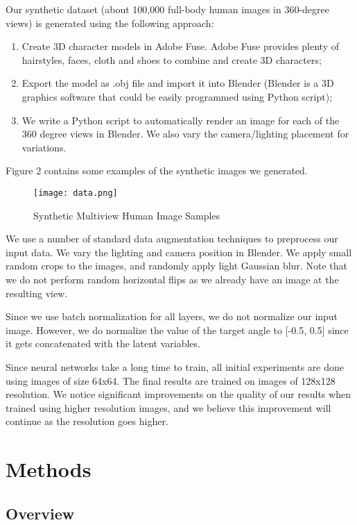 \documentclass[10pt,conference]{IEEEtran}
\begin{document}
Our synthetic dataset (about 100,000 full-body human images in 360-degree views) is generated using the following approach:
\renewcommand{\labelenumi}{\roman{enumi}}
 \begin{enumerate}
   \item Create 3D character models in Adobe Fuse. Adobe Fuse provides plenty of hairstyles, faces, cloth and shoes to combine and create 3D characters;
   \item Export the model as .obj file and import it into Blender (Blender is a 3D graphics software that could be easily programmed using Python script);
   \item We write a Python script to automatically render an image for each of the 360 degree views in Blender. We also vary the camera/lighting placement for variations. 
 \end{enumerate}

Figure 2 contains some examples of the synthetic images we generated.

\begin{figure}[htbp]
\centering
\texttt{[image: data.png]}
\caption{Synthetic Multiview Human Image Samples}
\end{figure}

We use a number of standard data augmentation techniques to preprocess our input data. We vary the lighting and camera position in Blender. We apply small random crops to the images, and randomly apply light Gaussian blur. Note that we do not perform random horizontal flips as we already have an image at the resulting view.

Since we use batch normalization \autocite{ioffe2015batch} for all layers, we do not normalize our input image. However, we do normalize the value of the target angle to [-0.5, 0.5] since it gets concatenated with the latent variables.

Since neural networks take a long time to train, all initial experiments are done using images of size 64x64. The final results are trained on images of 128x128 resolution. We notice significant improvements on the quality of our results when trained using higher resolution images, and we believe this improvement will continue as the resolution goes higher.



\section{Methods}

\subsection{Overview}
\end{document}
